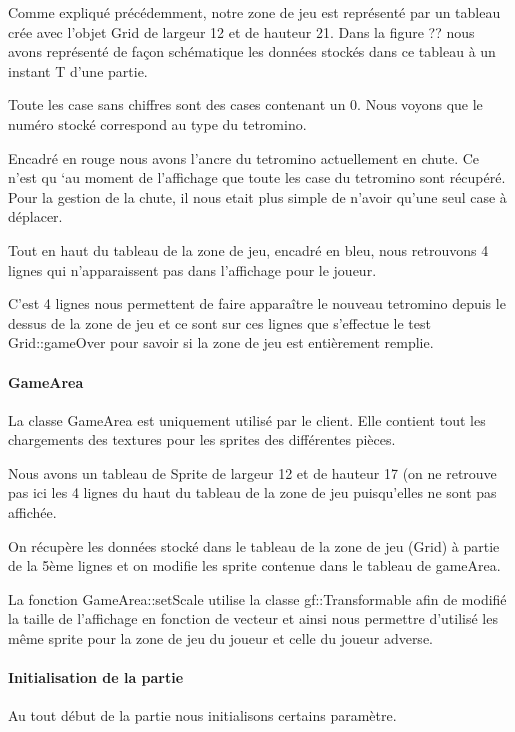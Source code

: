 \documentclass[a4paper, 12pt]{article}
\begin{document}
			Comme expliqué précédemment, notre zone de jeu est représenté par un tableau crée avec l’objet Grid de largeur 12 et de hauteur 21. Dans la figure ?? nous avons représenté de façon schématique les données stockés dans ce tableau à un instant T d’une partie.

			Toute les case sans chiffres sont des cases contenant un 0. Nous voyons que le numéro stocké correspond au type du tetromino.

			Encadré en rouge nous avons l’ancre du tetromino actuellement en chute. Ce n’est qu ‘au moment de l’affichage que toute les case du tetromino sont récupéré. Pour la gestion de la chute, il nous etait plus simple de n’avoir qu’une seul case à déplacer. 

			Tout en haut du tableau de la zone de jeu, encadré en bleu, nous retrouvons 4 lignes qui n’apparaissent pas dans l’affichage pour le joueur.

			C’est 4 lignes nous permettent de faire apparaître le nouveau tetromino depuis le dessus de la zone de jeu et ce sont sur ces lignes que s’effectue le test Grid::gameOver pour savoir si la zone de jeu est entièrement remplie.


			\paragraph{GameArea}

			La classe GameArea est uniquement utilisé par le client. Elle contient tout les chargements des textures pour les sprites des différentes pièces.

			Nous avons un tableau de Sprite de largeur 12 et de hauteur 17 (on ne retrouve pas ici les 4 lignes du haut du tableau de la zone de jeu puisqu’elles ne sont pas affichée.

			On récupère les données stocké dans le tableau de la zone de jeu (Grid) à partie de la 5ème lignes et on modifie les sprite contenue dans le tableau de gameArea.

			La fonction GameArea::setScale utilise la classe gf::Transformable afin de modifié la taille de l’affichage en fonction de vecteur et ainsi nous permettre d’utilisé les même sprite pour la zone de jeu du joueur et celle du joueur adverse.

			\paragraph{Initialisation de la partie}

				Au tout début de la partie nous initialisons certains paramètre.
\end{document}
